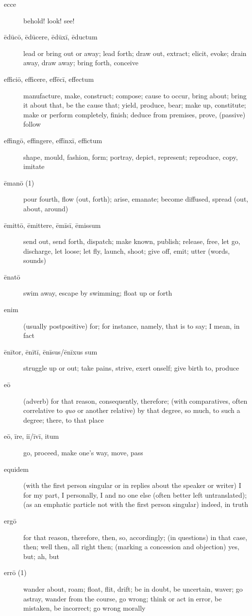 \begin{description}
    \item[ecce] \marginnote{*}behold! look! see!
    \item[ēdūcō, ēdūcere, ēdūxī, ēductum] \marginnote{*}lead or bring out or away; lead forth; draw out, extract; elicit, evoke; drain away, draw away; bring forth, conceive
    \item[efficiō, efficere, effēcī, effectum] \marginnote{*}manufacture, make, construct; compose; cause to occur, bring about; bring it about that, be the cause that; yield, produce, bear; make up, constitute; make or perform completely, finish; deduce from premises, prove, (passive) follow
    \item[effingō, effingere, effīnxī, effictum] shape, mould, fashion, form; portray, depict, represent; reproduce, copy, imitate
    \item[ēmanō (1)] pour fourth, flow (out, forth); arise, emanate; become diffused, spread (out, about, around)
    \item[ēmittō, ēmittere, ēmīsī, ēmissum] \marginnote{*}send out, send forth, dispatch; make known, publish; release, free, let go, discharge, let loose; let fly, launch, shoot; give off, emit; utter (words, sounds)
    \item[ēnatō] swim away, escape by swimming; float up or forth
    \item[enim] \marginnote{*}(usually postpositive) for; for instance, namely, that is to say; I mean, in fact
    \item[ēnītor, ēnītī, ēnīsus/ēnīxus sum] struggle up or out; take pains, strive, exert onself; give birth to, produce
    \item[eō] \marginnote{*}(adverb) for that reason, consequently, therefore; (with comparatives, often correlative to \textit{quo} or another relative) by that degree, so much, to such a degree; there, to that place
    \item[eō, īre, iī/īvī, itum] \marginnote{*}go, proceed, make one's way, move, pass
    \item[equidem] (with the first person singular or in replies about the speaker or writer) I for my part, I personally, I and no one else (often better left untranslated); (as an emphatic particle not with the first person singular) indeed, in truth
    \item[ergō] \marginnote{*}for that reason, therefore, then, so, accordingly; (in questions) in that case, then; well then, all right then; (marking a concession and objection) yes, but; ah, but
    \item[errō (1)] \marginnote{*}wander about, roam; float, flit, drift; be in doubt, be uncertain, waver; go astray, wander from the course, go wrong; think or act in error, be mistaken, be incorrect; go wrong morally

\end{description}
